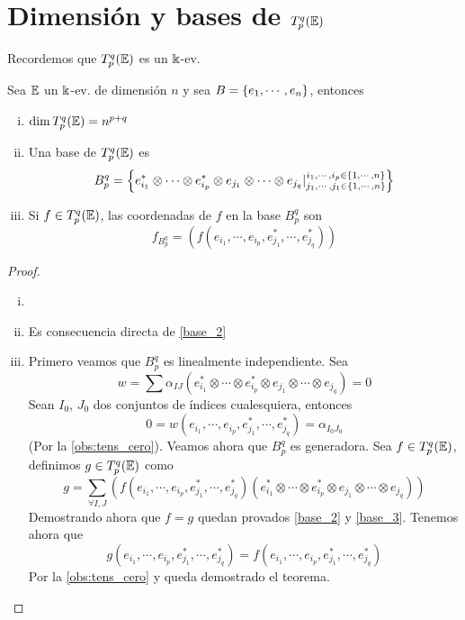 \section{Dimensión y bases de $T_p^q(\mathbb{E})$}

Recordemos que $T_p^q(\mathbb{E})$ es un $\Bbbk$-ev.

\begin{teo}
    Sea $\mathbb{E}$ un $\Bbbk$-ev. de dimensión $n$ y sea $B = \left\{e_1, \cdots, e_n\right\}$,
    entonces
\begin{enumerate}[i)]
        \item $\dim T_p^q(\mathbb{E}) = n^{p+q}$
        \item \label{base_2} Una base de $T_p^q(\mathbb{E})$ es
        \[
            B_p^q = \left\{ e_{i_1}^* \otimes \cdots \otimes e_{i_p}^* \otimes
            e_{j_1} \otimes \cdots \otimes e_{j_q} \vert
            \substack{i_1, \cdots, i_p \in \left\{1,\cdots,n\right\} \\
                j_1, \cdots, j_1 \in \left\{1,\cdots,n\right\}} \right\}
        \]
        \item \label{base_3} Si $f \in T_p^q(\mathbb{E})$, las coordenadas de $f$ en la base $B_p^q$ son
        \[
            f_{B_p^q} = (f(e_{i_1}, \cdots, e_{i_p}, e_{j_1}^*, \cdots, e_{j_q}^*))
        \]
    \end{enumerate}
\end{teo}
\begin{proof}
    \begin{enumerate}[i)]
        \item[]
        \item Es consecuencia directa de \ref{base_2}
        \item Primero veamos que $B_p^q$ es linealmente independiente. Sea
        \[
            w = \sum \alpha_{IJ}(e_{i_1}^* \otimes \cdots \otimes e_{i_p}^*
            \otimes e_{j_1} \otimes \cdots \otimes e_{j_q}) = 0
        \]
        Sean $I_0$, $J_0$ dos conjuntos de índices cualesquiera, entonces
        \[
            0 = w(e_{i_1}, \cdots, e_{i_p}, e_{j_1}^*, \cdots, e_{j_q}^*)
            = \alpha_{I_0J_0}
        \]
        (Por la \ref{obs:tens_cero}). Veamos ahora que $B_p^q$
        es generadora. Sea $f \in T_p^q(\mathbb{E})$, definimos $g \in T_p^q(\mathbb{E})$ como
        \[
            g = \sum_{\forall I,J} (f(e_{i_1}, \cdots, e_{i_p}, e_{j_1}^*, \cdots,
            e_{j_q}^*)(e_{i_1}^* \otimes \cdots \otimes e_{i_p}^* \otimes e_{j_1}
            \otimes \cdots \otimes e_{j_q}))
        \]
        Demostrando ahora que $f=g$ quedan provados \ref{base_2} y \ref{base_3}.
        Tenemos ahora que
        \[
            g(e_{i_1}, \cdots, e_{i_p}, e_{j_1}^*, \cdots, e_{j_q}^*) =
            f(e_{i_1}, \cdots, e_{i_p}, e_{j_1}^*, \cdots, e_{j_q}^*)
        \]
        Por la \ref{obs:tens_cero} y queda demostrado el teorema.
    \end{enumerate}
\end{proof}
